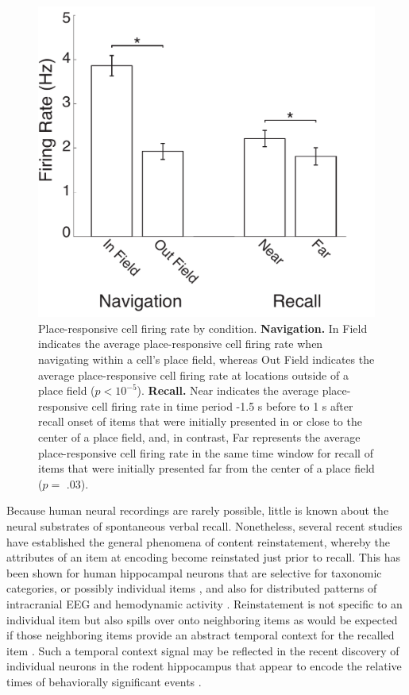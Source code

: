 \begin{figure}
\centering
  \includegraphics[width=.6\textwidth]{./tex/dboy/figs/fig4}
  \caption[Place-responsive cell firing rate by condition]{Place-responsive cell firing rate by condition. \textbf{Navigation.} In Field indicates the average place-responsive cell firing rate when navigating within a cell's place field, whereas Out Field indicates the average place-responsive cell firing rate at locations outside of a place field ($p < 10^{-5}$). \textbf{Recall.} Near indicates the average place-responsive cell firing rate in time period -1.5 s before to 1 s after recall onset of items that were initially presented in or close to the center of a place field, and, in contrast, Far represents the average place-responsive cell firing rate in the same time window for recall of items that were initially presented far from the center of a place field ($p =$ .03).}
\label{fig:fr_by_cond}
\end{figure}

Because human neural recordings are rarely possible, little is known about the neural substrates of spontaneous verbal recall.  Nonetheless, several recent studies have established the general phenomena of content reinstatement, whereby the attributes of an item at encoding become reinstated just prior to recall.  This has been shown for human hippocampal neurons that are selective for taxonomic categories, or possibly individual items \cite{GelbEtal08}, and also for distributed patterns of intracranial EEG and hemodynamic activity \cite{MannEtal12,PolyEtal05}.  Reinstatement is not specific to an individual item but also spills over onto neighboring items as would be expected if those neighboring items provide an abstract temporal context for the recalled item \cite{MannEtal11,HowaEtal12}.  Such a temporal context signal may be reflected in the recent discovery of individual neurons in the rodent hippocampus that appear to encode the relative times of behaviorally significant events \cite{PastEtal08,MacDEtal11}.


